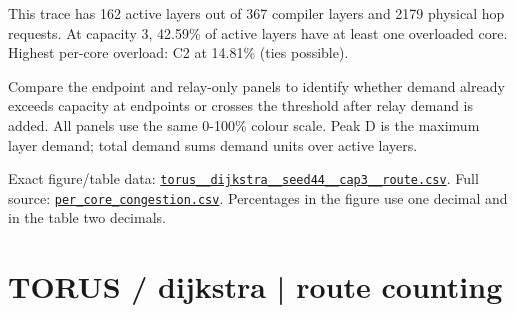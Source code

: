 \documentclass[10pt,a4paper]{article}
\begin{document}
This trace has 162 active layers out of 367 compiler layers and 2179 physical hop requests. At capacity 3, 42.59\% of active layers have at least one overloaded core. Highest per-core overload: C2 at 14.81\% (ties possible).\par
Compare the endpoint and relay-only panels to identify whether demand already exceeds capacity at endpoints or crosses the threshold after relay demand is added. All panels use the same 0-100\% colour scale. Peak D is the maximum layer demand; total demand sums demand units over active layers.\par
Exact figure/table data: \href{\detokenize{file:///home/dhruv-pansuriya/Documents/BTP/Compiler-Driven-ACE/output/pdf/qaoa_methods_congestion/tables/torus__dijkstra__seed44__cap3__route.csv}}{\nolinkurl{torus__dijkstra__seed44__cap3__route.csv}}. Full source: \href{\detokenize{file:///home/dhruv-pansuriya/Documents/BTP/Compiler-Driven-ACE/results/qaoa_2seed_2026-10-26/congestion/per_core_congestion.csv}}{\nolinkurl{per_core_congestion.csv}}. Percentages in the figure use one decimal and in the table two decimals.\par
\clearpage
\section*{TORUS / dijkstra | route counting}
\end{document}
